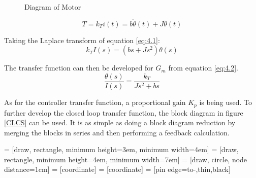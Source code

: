 \begin{figure}[H]
	\begin{center}
	\caption[Diagram of Motor]{Diagram of Motor}
	\label{BLDC}
	\end{center}
\end{figure}

\begin{equation} \label{eq:4.1}
T = k_T i(t) = b \dot \theta(t) + J \ddot \theta(t)
\end{equation}

Taking the Laplace transform of equation \ref{eq:4.1}:
\begin{equation} \label{eq:4.2}
k_T I(s) = (bs + Js^2)\theta(s)
\end{equation}

The transfer function can then be developed for $G_m$ from equation \ref{eq:4.2}.
\begin{equation}
\frac{\theta(s)}{I(s)} = \frac{k_T}{Js^2 + bs}
\end{equation}

As for the controller transfer function, a proportional gain $K_p$ is being used. To further develop the closed loop transfer function, the block diagram in figure \ref{CLCS} can be used. It is as simple as doing a block diagram reduction by merging the blocks in series and then performing a feedback calculation.

 = [draw, rectangle, 
minimum height=3em, minimum width=4em]
 = [draw, rectangle, 
minimum height=4em, minimum width=7em]
 = [draw, circle, node distance=1cm]
 = [coordinate]
 = [coordinate]
 = [pin edge={to-,thin,black}]

